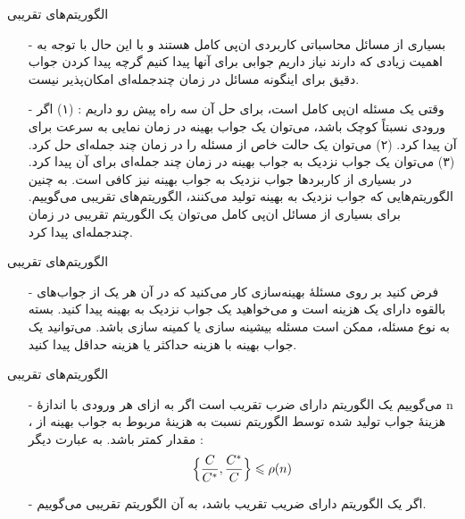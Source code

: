 
\begin{frame}{‌الگوریتم‌های تقریبی}
\begin{itemize}\itemr
\item[-]
بسیاری از مسائل محاسباتی کاربردی ان‌پی کامل هستند و با این حال با توجه به اهمیت زیادی که دارند نیاز داریم جوابی برای آنها پیدا کنیم گرچه پیدا کردن جواب دقیق برای اینگونه مسائل در زمان چندجمله‌ای امکان‌پذیر نیست.
\item[-]
وقتی یک مسئله ان‌پی کامل است، برای حل آن سه راه پیش رو داریم : (۱) اگر ورودی نسبتاً کوچک باشد، می‌توان یک جواب بهینه در زمان نمایی به سرعت برای آن پیدا کرد. (۲) می‌توان یک حالت خاص از مسئله را در زمان چند جمله‌ای حل کرد. (۳) می‌توان یک جواب نزدیک به جواب بهینه در زمان چند جمله‌ای برای آن پیدا کرد. در بسیاری از کاربردها جواب نزدیک به جواب بهینه
نیز کافی است. به چنین الگوریتم‌هایی که جواب نزدیک به بهینه تولید می‌کنند، الگوریتم‌های تقریبی
می‌گوییم. برای بسیاری از مسائل ان‌پی کامل می‌توان یک الگوریتم تقریبی در زمان چندجمله‌ای پیدا کرد.
\end{itemize}
\end{frame}


\begin{frame}{‌الگوریتم‌های تقریبی}
\begin{itemize}\itemr
\item[-]
فرض کنید بر روی مسئلهٔ بهینه‌سازی کار می‌کنید که در آن هر یک از جواب‌های بالقوه
دارای یک هزینه است و می‌خواهید یک جواب نزدیک به بهینه پیدا کنید. بسته به نوع مسئله، ممکن است مسئله بیشینه سازی
یا کمینه سازی
باشد. می‌توانید یک جواب بهینه با هزینه حداکثر یا هزینه حداقل پیدا کنید.
\end{itemize}
\end{frame}


\begin{frame}{‌الگوریتم‌های تقریبی}
\begin{itemize}\itemr
\item[-]
می‌گوییم یک الگوریتم دارای ضرب تقریب
است اگر به ازای هر ورودی با اندازهٔ n ، هزینهٔ
جواب تولید شده توسط الگوریتم نسبت به هزینهٔ
مربوط به جواب بهینه از مقدار
کمتر باشد. به عبارت دیگر :
\begin{align*}
\mathnormal{\Bigl\{ \frac{C}{C^*}, \frac{C^*}{C} \Bigr\} \leqslant \rho(n)}
\end{align*}
\item[-]
اگر یک الگوریتم دارای ضریب تقریب
باشد، به آن الگوریتم تقریبی
می‌گوییم.
\end{itemize}
\end{frame}


